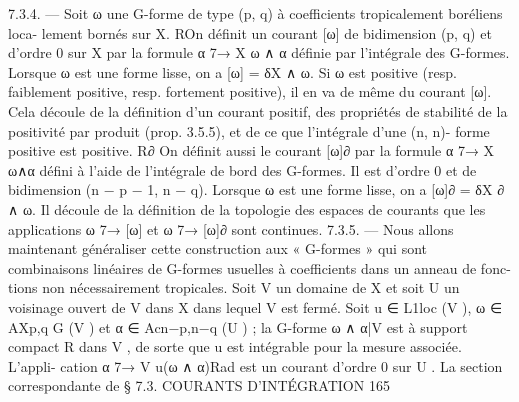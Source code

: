 \documentclass[
  10pt,
]{article}
\newenvironment{Shaded}{}{}
\newcommand{\NormalTok}[1]{#1}
\begin{document}
\begin{Shaded}
\begin{Highlighting}[]
\NormalTok{7.3.4. — Soit ω une G{-}forme de type (p, q) à coefficients tropicalement boréliens loca{-}}
\NormalTok{lement bornés sur X. ROn définit un courant [ω] de bidimension (p, q) et d’ordre 0 sur X}
\NormalTok{par la formule α 7→ X ω ∧ α définie par l’intégrale des G{-}formes. Lorsque ω est une}
\NormalTok{forme lisse, on a [ω] = δX ∧ ω.}
\NormalTok{   Si ω est positive (resp. faiblement positive, resp. fortement positive), il en va de même}
\NormalTok{du courant [ω]. Cela découle de la définition d’un courant positif, des propriétés de}
\NormalTok{stabilité de la positivité par produit (prop. 3.5.5), et de ce que l’intégrale d’une (n, n){-}}
\NormalTok{forme positive est positive.                             R∂}
\NormalTok{   On définit aussi le courant [ω]∂ par la formule α 7→ X ω∧α défini à l’aide de l’intégrale}
\NormalTok{de bord des G{-}formes. Il est d’ordre 0 et de bidimension (n − p − 1, n − q). Lorsque ω}
\NormalTok{est une forme lisse, on a [ω]∂ = δX ∂}
\NormalTok{                                      ∧ ω.}
\NormalTok{   Il découle de la définition de la topologie des espaces de courants que les applications}
\NormalTok{ω 7→ [ω] et ω 7→ [ω]∂ sont continues.}
\NormalTok{7.3.5. — Nous allons maintenant généraliser cette construction aux « G{-}formes » qui}
\NormalTok{sont combinaisons linéaires de G{-}formes usuelles à coefficients dans un anneau de fonc{-}}
\NormalTok{tions non nécessairement tropicales.}
\NormalTok{   Soit V un domaine de X et soit U un voisinage ouvert de V dans X dans lequel V}
\NormalTok{est fermé. Soit u ∈ L1loc (V ), ω ∈ AXp,q}
\NormalTok{                                       G}
\NormalTok{                                          (V ) et α ∈ Acn−p,n−q (U ) ; la G{-}forme ω ∧ α|V est à}
\NormalTok{support compact}
\NormalTok{            R     dans V , de sorte que u est intégrable pour la mesure associée. L’appli{-}}
\NormalTok{cation α 7→ V u(ω ∧ α)Rad est un courant d’ordre 0 sur U . La section correspondante de}
\NormalTok{                              § 7.3. COURANTS D’INTÉGRATION                              165}


\end{Highlighting}
\end{Shaded}
\end{document}
